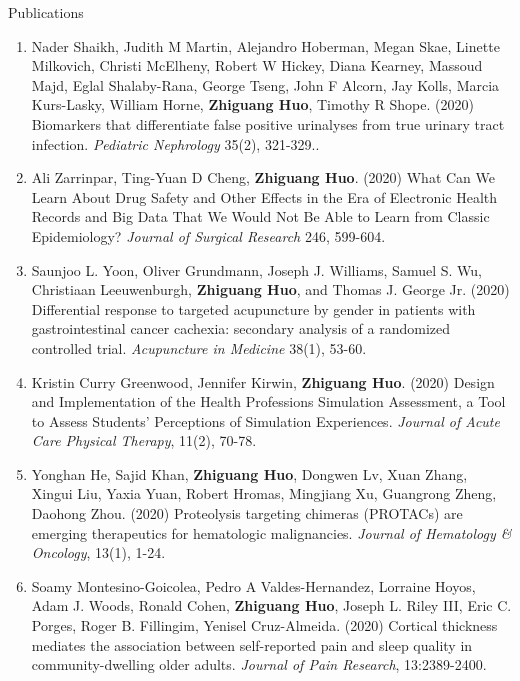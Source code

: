 \documentclass{resume} %
\begin{document}
\begin{rSection}{Publications}
\begin{enumerate}[noitemsep,topsep=0pt, resume]
\item
Nader Shaikh, Judith M Martin, Alejandro Hoberman, Megan Skae, Linette Milkovich, Christi McElheny, Robert W Hickey, Diana Kearney, Massoud Majd, Eglal Shalaby-Rana, George Tseng, John F Alcorn, Jay Kolls, Marcia Kurs-Lasky, William Horne, {\bf Zhiguang Huo}, Timothy R Shope.  (2020)
Biomarkers that differentiate false positive urinalyses from true urinary tract infection. 
\emph{Pediatric Nephrology}  35(2), 321-329..



\item
Ali Zarrinpar,  Ting-Yuan D Cheng, {\bf Zhiguang Huo}. (2020)
What Can We Learn About Drug Safety and Other Effects in the Era of Electronic Health Records and Big Data That We Would Not Be Able to Learn from Classic Epidemiology?
\emph{Journal of Surgical Research} 246, 599-604.

\item 
Saunjoo L. Yoon, Oliver Grundmann, Joseph J. Williams, Samuel S. Wu, Christiaan Leeuwenburgh, {\bf Zhiguang Huo}, and Thomas J. George Jr. (2020)
Differential response to targeted acupuncture by gender in patients with gastrointestinal cancer cachexia: secondary analysis of a randomized controlled trial.
\emph{Acupuncture in Medicine}  38(1), 53-60.

\item
Kristin Curry Greenwood,  Jennifer Kirwin, {\bf Zhiguang Huo}. (2020)
Design and Implementation of the Health Professions Simulation Assessment, a Tool to Assess Students' Perceptions of Simulation Experiences. \emph{Journal of Acute Care Physical Therapy}, 11(2), 70-78.


 
\item
Yonghan He, Sajid Khan, {\bf Zhiguang Huo}, Dongwen Lv, Xuan Zhang, Xingui Liu, Yaxia Yuan, Robert Hromas, Mingjiang Xu, Guangrong Zheng, Daohong Zhou. (2020)
Proteolysis targeting chimeras (PROTACs) are emerging therapeutics for hematologic malignancies.
\emph{Journal of Hematology \& Oncology}, 13(1), 1-24.

\item  
Soamy Montesino-Goicolea, Pedro A Valdes-Hernandez,  Lorraine Hoyos, Adam J. Woods, Ronald Cohen,  {\bf Zhiguang Huo}, Joseph L. Riley III, Eric C. Porges, Roger B. Fillingim, Yenisel Cruz-Almeida. (2020)
Cortical thickness mediates the association between self-reported pain and sleep quality in community-dwelling older adults. 
\emph{Journal of Pain Research}, 13:2389-2400.



\end{enumerate}
\end{rSection}
\end{document}
